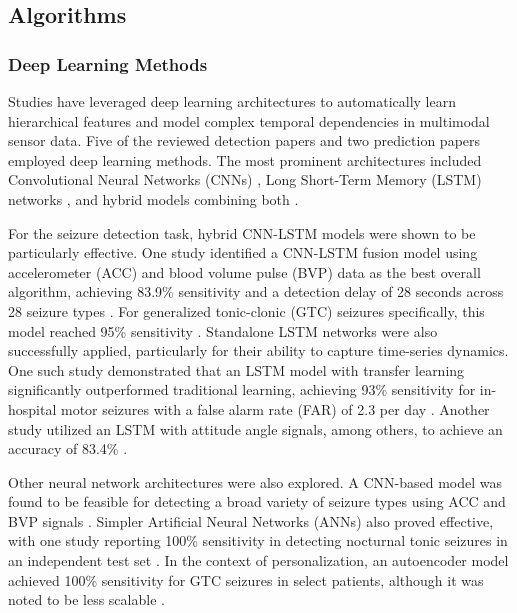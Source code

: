 \subsection{Algorithms}

\subsubsection{Deep Learning Methods}
Studies have leveraged deep learning architectures to automatically learn hierarchical features and model complex temporal dependencies in multimodal sensor data. Five of the reviewed detection papers \cite{Yu2023-ss, Nasseri2021-xn, Larsen2024-vn, Wang2025-ql, Tang2021-td} and two prediction papers \cite{Vieluf2023-ta, Meisel2020-ii} employed deep learning methods. The most prominent architectures included Convolutional Neural Networks (CNNs) \cite{Yu2023-ss, Tang2021-td}, Long Short-Term Memory (LSTM) networks \cite{Meisel2020-ii, Yu2023-ss, Wang2025-ql}, and hybrid models combining both \cite{Yu2023-ss}.

For the seizure detection task, hybrid CNN-LSTM models were shown to be particularly effective. One study identified a CNN-LSTM fusion model using accelerometer (ACC) and blood volume pulse (BVP) data as the best overall algorithm, achieving 83.9\% sensitivity and a detection delay of 28 seconds across 28 seizure types \cite{Yu2023-ss}. For generalized tonic-clonic (GTC) seizures specifically, this model reached 95\% sensitivity \cite{Yu2023-ss}. Standalone LSTM networks were also successfully applied, particularly for their ability to capture time-series dynamics. One such study demonstrated that an LSTM model with transfer learning significantly outperformed traditional learning, achieving 93\% sensitivity for in-hospital motor seizures with a false alarm rate (FAR) of 2.3 per day \cite{Nasseri2021-xn}. Another study utilized an LSTM with attitude angle signals, among others, to achieve an accuracy of 83.4\% \cite{Wang2025-ql}.

Other neural network architectures were also explored. A CNN-based model was found to be feasible for detecting a broad variety of seizure types using ACC and BVP signals \cite{Tang2021-td}. Simpler Artificial Neural Networks (ANNs) also proved effective, with one study reporting 100\% sensitivity in detecting nocturnal tonic seizures in an independent test set \cite{Larsen2024-vn}. In the context of personalization, an autoencoder model achieved 100\% sensitivity for GTC seizures in select patients, although it was noted to be less scalable \cite{Yu2023-ss}.

